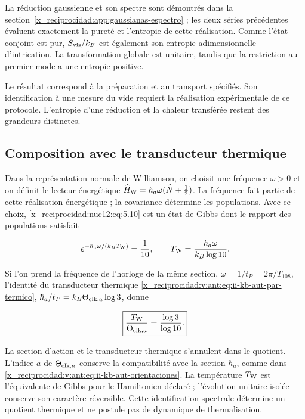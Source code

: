 La réduction gaussienne et son spectre sont démontrés dans la section~\ref{x_reciprocidad:app:gaussianas-espectro} ; les deux séries précédentes évaluent exactement la pureté et l’entropie de cette réalisation. Comme l’état conjoint est pur, \(S_{\rm vis}/k_B\) est également son entropie adimensionnelle d’intrication. La transformation globale est unitaire, tandis que la restriction au premier mode a une entropie positive.

Le résultat correspond à la préparation et au transport spécifiés. Son identification à une mesure du vide requiert la réalisation expérimentale de ce protocole. L’entropie d’une réduction et la chaleur transférée restent des grandeurs distinctes.

\subsection{Composition avec le transducteur thermique}

Dans la représentation normale de Williamson, on choisit une fréquence \(\omega>0\) et on définit le lecteur énergétique
\(\widehat H_{\rm W}=\hbar_a\omega(\widehat N+\tfrac12)\). La fréquence fait partie de cette réalisation énergétique ; la covariance détermine les populations. Avec ce choix, \eqref{x_reciprocidad:nuc12:eq:5.10} est un état de Gibbs dont le rapport des populations satisfait



\[
e^{-\hbar_a\omega/(k_BT_{\rm W})}=\frac1{10},\qquad
T_{\rm W}=\frac{\hbar_a\omega}{k_B\log10}.
\]



Si l’on prend la fréquence de l’horloge de la même section, \(\omega=1/t_P=2\pi/T_{108}\), l’identité du transducteur thermique \eqref{x_reciprocidad:v:ant:eq:ii-kb-aut-par-termico},
\(\hbar_a/t_P=k_B\Theta_{{\rm clk},a}\log3\), donne



\begin{equation}
\boxed{\frac{T_{\rm W}}{\Theta_{{\rm clk},a}}=\frac{\log3}{\log10}.}
\label{x_reciprocidad:nuc12:eq:5.11}
\end{equation}



La section d’action et le transducteur thermique s’annulent dans le quotient. L’indice \(a\) de \(\Theta_{{\rm clk},a}\) conserve la compatibilité avec la section \(\hbar_a\), comme dans \eqref{x_reciprocidad:v:ant:eq:ii-kb-aut-orientaciones}. La température \(T_{\rm W}\) est l’équivalente de Gibbs pour le Hamiltonien déclaré ; l’évolution unitaire isolée conserve son caractère réversible. Cette identification spectrale détermine un quotient thermique et ne postule pas de dynamique de thermalisation.

